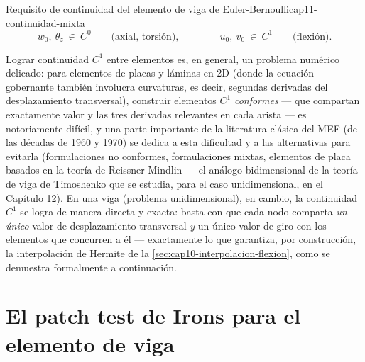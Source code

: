 \begin{ecnimportante}{Requisito de continuidad del elemento de viga de Euler-Bernoulli}{cap11-continuidad-mixta}
\[
w_0,\ \theta_z \ \in\ C^0 \qquad \text{(axial, torsión)}, \qquad\qquad u_0,\ v_0 \ \in\ C^1 \qquad \text{(flexión)} .
\]
\end{ecnimportante}

\begin{observacion}
Lograr continuidad $C^1$ entre elementos es, en general, un problema numérico delicado: para elementos de placas y láminas en 2D (donde la ecuación gobernante también involucra curvaturas, es decir, segundas derivadas del desplazamiento transversal), construir elementos $C^1$ \emph{conformes} --- que compartan exactamente valor y las tres derivadas relevantes en cada arista --- es notoriamente difícil, y una parte importante de la literatura clásica del MEF (de las décadas de 1960 y 1970) se dedica a esta dificultad y a las alternativas para evitarla (formulaciones no conformes, formulaciones mixtas, elementos de placa basados en la teoría de Reissner-Mindlin --- el análogo bidimensional de la teoría de viga de Timoshenko que se estudia, para el caso unidimensional, en el Capítulo 12). En una viga (problema unidimensional), en cambio, la continuidad $C^1$ se logra de manera directa y exacta: basta con que cada nodo comparta \emph{un único} valor de desplazamiento transversal \emph{y} un único valor de giro con los elementos que concurren a él --- exactamente lo que garantiza, por construcción, la interpolación de Hermite de la \cref{sec:cap10-interpolacion-flexion}, como se demuestra formalmente a continuación.
\end{observacion}

\section{El patch test de Irons para el elemento de viga}
\label{sec:cap11-patch-test}

